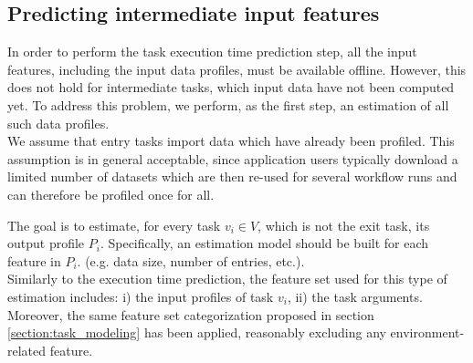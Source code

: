 \documentclass[a4paper, 10pt, conference]{ieeeconf}      %
\begin{document}
\color{black}
\subsection{Predicting intermediate input features}
%
\label{section:intermediate_input}
In order to perform the task execution time prediction step, all the input features, including the input data profiles, must be available offline. However, this does not hold for intermediate tasks, which input data have not been computed yet. To address this problem, we perform, as the first step, an estimation of all such data profiles.\\
We assume that entry tasks import data which have already been profiled.
This assumption is in general acceptable, since application users typically download a limited number of datasets which are then re-used for several workflow runs and can therefore be profiled once for all.

 The goal is to estimate, for every task $v_i \in V$, which is not the exit task, its output profile $P_i$.
 Specifically, an estimation model should be built for each feature in $P_i$. (e.g. data size, number of entries, etc.). \\
 Similarly to the execution time prediction, the feature set used for this type of estimation includes: i) the input profiles of task $v_i$, ii) the task arguments.  Moreover, the same feature set  categorization proposed in section \ref{section:task_modeling} has been applied, reasonably excluding any environment-related feature.
 
\end{document}
